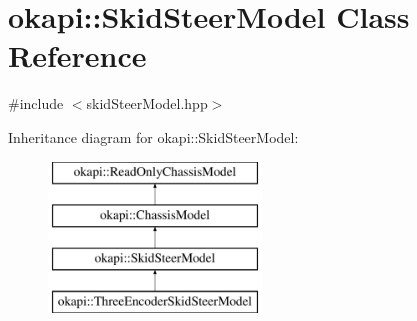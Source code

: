 \hypertarget{classokapi_1_1SkidSteerModel}{}\section{okapi\+::Skid\+Steer\+Model Class Reference}
\label{classokapi_1_1SkidSteerModel}


{\ttfamily \#include $<$skid\+Steer\+Model.\+hpp$>$}

Inheritance diagram for okapi\+::Skid\+Steer\+Model\+:\begin{figure}[H]
\begin{center}
\leavevmode
\includegraphics[height=4.000000cm]{classokapi_1_1SkidSteerModel}
\end{center}
\end{figure}
